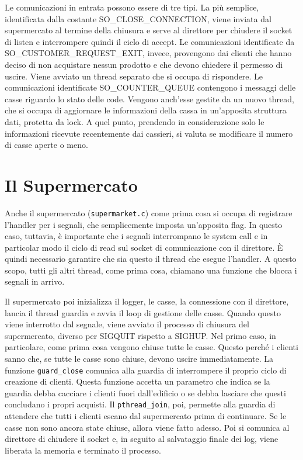 \documentclass[a4paper,11pt,twoside] {article}
\begin{document}
Le comunicazioni in entrata possono essere di tre tipi. La più semplice, identificata dalla costante SO\_CLOSE\_CONNECTION, viene inviata dal supermercato al termine della chiusura e serve al direttore per chiudere il socket di listen e interrompere quindi il ciclo di accept. Le comunicazioni identificate da SO\_CUSTOMER\_REQUEST\_EXIT, invece, provengono dai clienti che hanno deciso di non acquistare nessun prodotto e che devono chiedere il permesso di uscire. Viene avviato un thread separato che si occupa di rispondere. Le comunicazioni identificate SO\_COUNTER\_QUEUE contengono i messaggi delle casse riguardo lo stato delle code. Vengono anch'esse gestite da un nuovo thread, che si occupa di aggiornare le informazioni della cassa in un'apposita struttura dati, protetta da lock. A quel punto, prendendo in considerazione solo le informazioni ricevute recentemente dai cassieri, si valuta se modificare il numero di casse aperte o meno.

\section*{Il Supermercato}

Anche il supermercato (\lstinline{supermarket.c}) come prima cosa si occupa di registrare l'handler per i segnali, che semplicemente imposta un'apposita flag. In questo caso, tuttavia, è importante che i segnali interrompano le system call e in particolar modo il ciclo di read sul socket di comunicazione con il direttore. È quindi necessario garantire che sia questo il thread che esegue l'handler. A questo scopo, tutti gli altri thread, come prima cosa, chiamano una funzione che blocca i segnali in arrivo.

Il supermercato poi inizializza il logger, le casse, la connessione con il direttore, lancia il thread guardia e avvia il loop di gestione delle casse. Quando questo viene interrotto dal segnale, viene avviato il processo di chiusura del supermercato, diverso per SIGQUIT rispetto a SIGHUP. Nel primo caso, in particolare, come prima cosa vengono chiuse tutte le casse. Questo perché i clienti sanno che, se tutte le casse sono chiuse, devono uscire immediatamente. La funzione \lstinline{guard_close} comunica alla guardia di interrompere il proprio ciclo di creazione di clienti. Questa funzione accetta un parametro che indica se la guardia debba cacciare i clienti fuori dall'edificio o se debba lasciare che questi concludano i propri acquisti. Il \lstinline{pthread_join}, poi, permette alla guardia di attendere che tutti i clienti escano dal supermercato prima di continuare. Se le casse non sono ancora state chiuse, allora viene fatto adesso. Poi si comunica al direttore di chiudere il socket e, in seguito al salvataggio finale dei log, viene liberata la memoria e terminato il processo.
\end{document}
